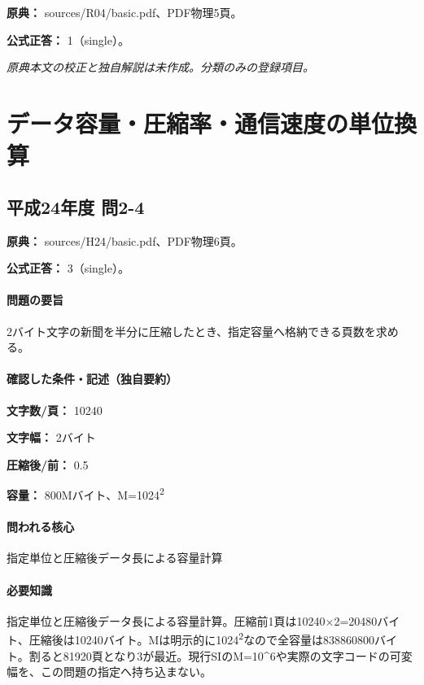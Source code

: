 \noindent\textbf{原典：} sources/R04/basic.pdf、PDF物理5頁。

\textbf{公式正答：} 1（single）。

\par\textit{原典本文の校正と独自解説は未作成。分類のみの登録項目。}

\section{データ容量・圧縮率・通信速度の単位換算}

\subsection{平成24年度 問2-4}
\label{q:h24-reg-basic-2-4}

\noindent\textbf{原典：} sources/H24/basic.pdf、PDF物理6頁。

\textbf{公式正答：} 3（single）。

\paragraph{問題の要旨} 2バイト文字の新聞を半分に圧縮したとき、指定容量へ格納できる頁数を求める。

\paragraph{確認した条件・記述（独自要約）}\mbox{}\par

\noindent\textbf{文字数/頁：} 10240\par

\noindent\textbf{文字幅：} 2バイト\par

\noindent\textbf{圧縮後/前：} 0.5\par

\noindent\textbf{容量：} 800Mバイト、M=\allowbreak{}1024\textsuperscript{2}\par

\paragraph{問われる核心} 指定単位と圧縮後データ長による容量計算

\paragraph{必要知識} 指定単位と圧縮後データ長による容量計算。圧縮前1頁は10240×2=\allowbreak{}20480バイト、圧縮後は10240バイト。Mは明示的に1024\textsuperscript{2}なので全容量は838860800バイト。割ると81920頁となり3が最近。現行SIのM=\allowbreak{}10\textasciicircum{}6や実際の文字コードの可変幅を、この問題の指定へ持ち込まない。

